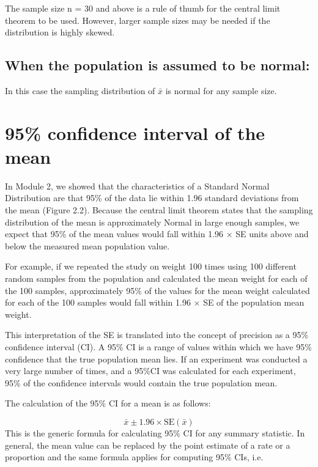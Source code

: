 \documentclass[
]{memoir}
\begin{document}
The sample size n = 30 and above is a rule of thumb for the central limit theorem to be used. However, larger sample sizes may be needed if the distribution is highly skewed.

\hypertarget{when-the-population-is-assumed-to-be-normal}{%
\subsection{When the population is assumed to be normal:}\label{when-the-population-is-assumed-to-be-normal}}

In this case the sampling distribution of \(\bar{x}\) is normal for any sample size.

\hypertarget{confidence-interval-of-the-mean}{%
\section{95\% confidence interval of the mean}\label{confidence-interval-of-the-mean}}

In Module 2, we showed that the characteristics of a Standard Normal Distribution are that 95\% of the data lie within 1.96 standard deviations from the mean (Figure 2.2). Because the central limit theorem states that the sampling distribution of the mean is approximately Normal in large enough samples, we expect that 95\% of the mean values would fall within 1.96 × SE units above and below the measured mean population value.

For example, if we repeated the study on weight 100 times using 100 different random samples from the population and calculated the mean weight for each of the 100 samples, approximately 95\% of the values for the mean weight calculated for each of the 100 samples would fall within 1.96 × SE of the population mean weight.

This interpretation of the SE is translated into the concept of precision as a 95\% confidence interval (CI). A 95\% CI is a range of values within which we have 95\% confidence that the true population mean lies. If an experiment was conducted a very large number of times, and a 95\%CI was calculated for each experiment, 95\% of the confidence intervals would contain the true population mean.

The calculation of the 95\% CI for a mean is as follows:

\[  \bar{x} \pm 1.96 \times \text{SE}( \bar{x} ) \]
This is the generic formula for calculating 95\% CI for any summary statistic. In general, the mean value can be replaced by the point estimate of a rate or a proportion and the same formula applies for computing 95\% CIs, i.e.
\end{document}
